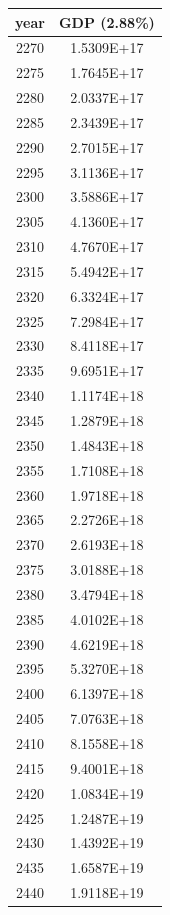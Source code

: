 \documentclass[a4paper]{article}
\begin{document}
	\begin{tabular}{|c|c|}
		\hline
		year & GDP (2.88\%) \\
		\hline
		2270 & 1.5309E+17 \\
		\hline
		2275 & 1.7645E+17 \\
		\hline
		2280 & 2.0337E+17 \\
		\hline
		2285 & 2.3439E+17 \\
		\hline
		2290 & 2.7015E+17 \\
		\hline
		2295 & 3.1136E+17 \\
		\hline
		2300 & 3.5886E+17 \\
		\hline
		2305 & 4.1360E+17 \\
		\hline
		2310 & 4.7670E+17 \\
		\hline
		2315 & 5.4942E+17 \\
		\hline
		2320 & 6.3324E+17 \\
		\hline
		2325 & 7.2984E+17 \\
		\hline
		2330 & 8.4118E+17 \\
		\hline
		2335 & 9.6951E+17 \\
		\hline
		2340 & 1.1174E+18 \\
		\hline
		2345 & 1.2879E+18 \\
		\hline
		2350 & 1.4843E+18 \\
		\hline
		2355 & 1.7108E+18 \\
		\hline
		2360 & 1.9718E+18 \\
		\hline
		2365 & 2.2726E+18 \\
		\hline
		2370 & 2.6193E+18 \\
		\hline
		2375 & 3.0188E+18 \\
		\hline
		2380 & 3.4794E+18 \\
		\hline
		2385 & 4.0102E+18 \\
		\hline
		2390 & 4.6219E+18 \\
		\hline
		2395 & 5.3270E+18 \\
		\hline
		2400 & 6.1397E+18 \\
		\hline
		2405 & 7.0763E+18 \\
		\hline
		2410 & 8.1558E+18 \\
		\hline
		2415 & 9.4001E+18 \\
		\hline
		2420 & 1.0834E+19 \\
		\hline
		2425 & 1.2487E+19 \\
		\hline
		2430 & 1.4392E+19 \\
		\hline
		2435 & 1.6587E+19 \\
		\hline
		2440 & 1.9118E+19 \\

\end{tabular}
\end{document}
